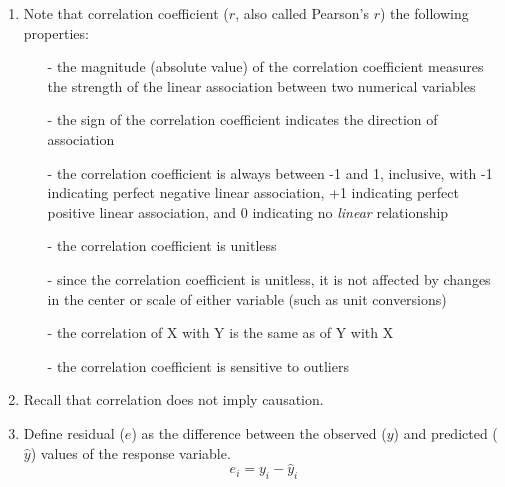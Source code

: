 \documentclass[11pt]{article}
\begin{document}
\begin{enumerate}
\item Note that correlation coefficient ($r$, also called Pearson's $r$) the following properties:
\begin{enumerate}
\item[-] the magnitude (absolute value) of the correlation coefficient measures the strength of the linear association between two numerical variables
\item[-] the sign of the correlation coefficient indicates the direction of association
\item[-] the correlation coefficient is always between -1 and 1, inclusive, with -1 indicating perfect negative linear association, +1 indicating perfect positive linear association, and 0 indicating no \emph{linear} relationship
\item[-] the correlation coefficient is unitless
\item[-] since the correlation coefficient is unitless, it is not affected by changes in the center or scale of either variable (such as unit conversions)
\item[-] the correlation of X with Y is the same as of Y with X 
\item[-] the correlation coefficient is sensitive to outliers
\end{enumerate}

\item Recall that correlation does not imply causation.

\item Define residual ($e$) as the difference between the observed ($y$) and predicted ($\hat{y}$) values of the response variable.
\[ e_i = y_i - \hat{y}_i \]

\end{enumerate}
\end{document}

